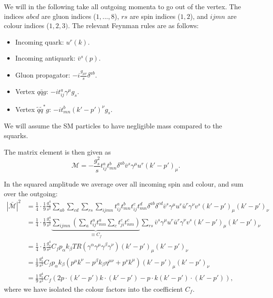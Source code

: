\documentclass[notes.tex]{subfiles}
\begin{document}
\begin{Answer}
We will in the following take all outgoing momenta to go out of the vertex. The indices $abcd$ are gluon indices ($1,...,8$), $rs$ are spin indices ($1,2$), and $ijmn$ are colour indices ($1,2,3)$. The relevant  Feynman rules are as follows:
\begin{itemize}
\item Incoming quark: $u^r(k)$.
\item Incoming antiquark: $\bar{v}^s(p)$.
\item Gluon propagator: $-i \frac{g_{\mu\nu}}{s}\delta^{ab}$.
\item Vertex $q \bar{q} g$: $- i t^a_{ij}\gamma^\mu g_s$.
\item Vertex $\tilde{q}\tilde{q}^* g$: $- i t^b_{mn} (k'-p')^\nu g_s$.
\end{itemize}
We will assume the SM particles to have negligible mass compared to the squarks.

The matrix element is then given as
\begin{equation*}
\mathcal{M} = -\frac{g_s^2}{s} t^a_{ij} t^b_{mn} \delta^{ab} \bar{v}^s\gamma^\mu u^r(k'-p')_\mu.
\end{equation*}

In the squared amplitude we average over all incoming spin and colour, and sum over the outgoing:
\begin{align*}
|\bar{\mathcal{M}}|^2 & = \frac{1}{4}\cdot \frac{1}{9} \frac{g_s^4}{s^2}\sum_{ab}\sum_{cd}\sum_{rs}\sum_{ijmn} t^a_{ij} t^b_{mn} t^c_{ij} t^d_{mn} \delta^{ab} \delta^{cd} \bar{v}^s \gamma^\mu u^r \bar{u}^r \gamma^\nu v^s (k'-p')_\mu (k'-p')_\nu\\
& = \frac{1}{4}\cdot \frac{1}{9} \frac{g_s^4}{s^2}\underbrace{\sum_{ijmn} \left(\sum_a t^a_{ij} t^a_{mn} \sum_c t^c_{ji} t^c_{nm} \right)}_{\equiv C_f}  \sum_{rs} \bar{v}^s \gamma^\mu u^r \bar{u}^r \gamma^\nu v^s (k'-p')_\mu (k'-p')_\nu\\
& = \frac{1}{4}\cdot \frac{1}{9} \frac{g_s^4}{s^2}C_f p_\alpha k_\beta TR(\gamma^\alpha \gamma^\mu \gamma^\beta \gamma^\nu)(k'-p')_\mu(k'-p')_\nu\\
& = \frac{1}{9} \frac{g_s^4}{s^2}C_f p_\alpha k_\beta (p^\mu k^\nu - p^\beta k_\beta \eta^{\mu\nu} + p^\nu k^\mu)(k'-p')_\mu(k'-p')_\nu\\
& = \frac{1}{9} \frac{g_s^4}{s^2}C_f (2p \cdot (k'-p') k\cdot (k'-p') - p\cdot k (k'-p') \cdot (k'-p')),
\end{align*}
where we have isolated the colour factors into the coefficient $C_f$.


\end{Answer}
\end{document}
